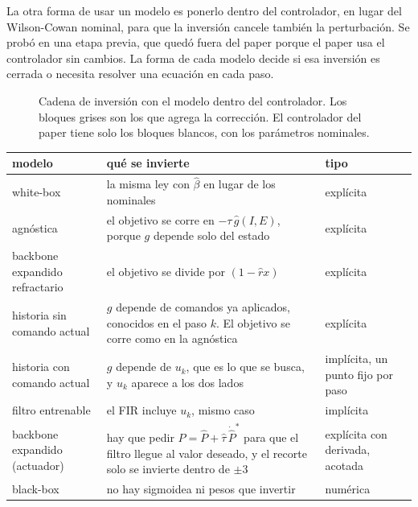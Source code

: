 \documentclass[10pt,a4paper]{article}
\newcommand{\bh}{\hat\beta}
\begin{document}
La otra forma de usar un modelo es ponerlo dentro del controlador, en lugar del Wilson-Cowan nominal, para que la inversión cancele también la perturbación. Se probó en una etapa previa, que quedó fuera del paper porque el paper usa el controlador sin cambios. La forma de cada modelo decide si esa inversión es cerrada o necesita resolver una ecuación en cada paso.

\begin{figure}[H]
\centering
{}
\caption{Cadena de inversión con el modelo dentro del controlador. Los bloques grises son los que agrega la corrección. El controlador del paper tiene solo los bloques blancos, con los parámetros nominales.}
\label{fig:inversion}
\end{figure}

\begin{center}
\small
\begin{tabular}{@{}L{3.4cm}L{9.2cm}L{3.2cm}@{}}
\toprule
modelo & qué se invierte & tipo \\
\midrule
white-box & la misma ley con $\bh$ en lugar de los nominales & explícita \\
agnóstica & el objetivo se corre en $-\tau\,\hat g(I, E)$, porque $g$ depende solo del estado & explícita \\
backbone expandido refractario & el objetivo se divide por $(1 - \hat r x)$ & explícita \\
historia sin comando actual & $g$ depende de comandos ya aplicados, conocidos en el paso $k$. El objetivo se corre como en la agnóstica & explícita \\
historia con comando actual & $g$ depende de $u_k$, que es lo que se busca, y $u_k$ aparece a los dos lados & implícita, un punto fijo por paso \\
filtro entrenable & el FIR incluye $u_k$, mismo caso & implícita \\
backbone expandido (actuador) & hay que pedir $P = \hat P + \hat\tau\,\dot{\hat P}^{*}$ para que el filtro llegue al valor deseado, y el recorte solo se invierte dentro de $\pm 3$ & explícita con derivada, acotada \\
black-box & no hay sigmoidea ni pesos que invertir & numérica \\
\bottomrule
\end{tabular}
\end{center}
\end{document}
